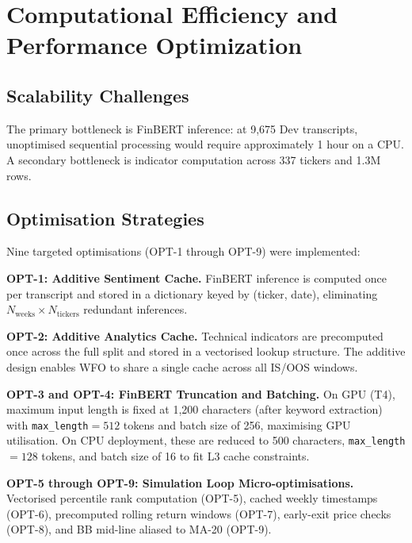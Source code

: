 \documentclass[11pt,twoside,a4paper]{article}
\begin{document}
\section[Computational Efficiency]{Computational Efficiency and Performance Optimization}

\subsection{Scalability Challenges}

The primary bottleneck is FinBERT inference: at 9,675 Dev transcripts, unoptimised sequential processing would require approximately 1 hour on a CPU. A secondary bottleneck is indicator computation across 337 tickers and 1.3M rows.

\subsection{Optimisation Strategies}

Nine targeted optimisations (OPT-1 through OPT-9) were implemented:

\textbf{OPT-1: Additive Sentiment Cache.} FinBERT inference is computed once per transcript and stored in a dictionary keyed by (ticker, date), eliminating $N_{\text{weeks}} \times N_{\text{tickers}}$ redundant inferences.

\textbf{OPT-2: Additive Analytics Cache.} Technical indicators are precomputed once across the full split and stored in a vectorised lookup structure. The additive design enables WFO to share a single cache across all IS/OOS windows.

\textbf{OPT-3 and OPT-4: FinBERT Truncation and Batching.} On GPU (T4), maximum input length is fixed at 1,200 characters (after keyword extraction) with \texttt{max\_length}$=512$ tokens and batch size of 256, maximising GPU utilisation. On CPU deployment, these are reduced to 500 characters, \texttt{max\_length}$=128$ tokens, and batch size of 16 to fit L3 cache constraints.

\textbf{OPT-5 through OPT-9: Simulation Loop Micro-optimisations.} Vectorised percentile rank computation (OPT-5), cached weekly timestamps (OPT-6), precomputed rolling return windows (OPT-7), early-exit price checks (OPT-8), and BB mid-line aliased to MA-20 (OPT-9).
\end{document}
